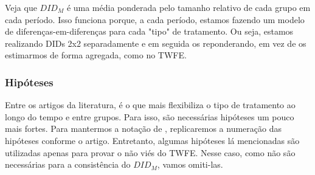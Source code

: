 \documentclass[portugues]{article}
\begin{document}
\noindent Veja que $DID_{M}$ é uma média ponderada pelo tamanho relativo de cada grupo em cada período. Isso funciona porque, a cada período, estamos fazendo um modelo de diferenças-em-diferenças para cada "tipo" de tratamento. Ou seja, estamos realizando DIDs 2x2 separadamente e em seguida os reponderando, em vez de os estimarmos de forma agregada, como no TWFE.

\subsubsection{Hipóteses} \label{subsec:char_hyp}

Entre os artigos da literatura, \cite{de2020two} é o que mais flexibiliza o tipo de tratamento ao longo do tempo e entre grupos. Para isso, são necessárias hipóteses um pouco mais fortes. Para mantermos a notação de \cite{de2020two}, replicaremos a numeração das hipóteses conforme o artigo. Entretanto, algumas hipóteses lá mencionadas são utilizadas apenas para provar o não viés do TWFE. Nesse caso, como não são necessárias para a consistência do $DID_M$, vamos omiti-las. 
\end{document}

